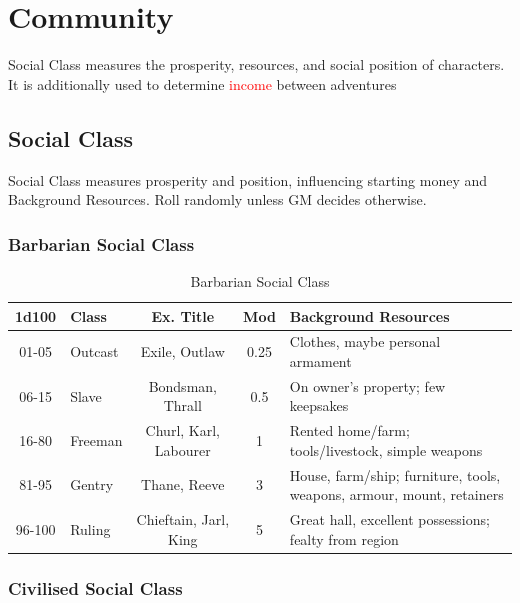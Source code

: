 \documentclass[10pt]{article}
\begin{document}
\section{Community}
\label{sec:community}

Social Class measures the prosperity, resources, and social position of characters. It is additionally used to determine \textcolor{red}{income} between adventures 

\subsection{Social Class}
\label{sec:social-class}

Social Class measures prosperity and position, influencing starting money and Background Resources. Roll randomly unless GM decides otherwise.

\subsubsection{Barbarian Social Class}

\begin{longtable}{|c|l|c|c|p{7cm}|}
\caption{Barbarian Social Class}
\label{tab:barbarian-social-class}\\
\hline
\textbf{1d100} & \textbf{Class} & \textbf{Ex. Title} & \textbf{Mod} & \textbf{Background Resources} \\
\hline
01-05 & Outcast & Exile, Outlaw & 0.25 & Clothes, maybe personal armament \\
\hline
06-15 & Slave & Bondsman, Thrall & 0.5 & On owner's property; few keepsakes \\
\hline
16-80 & Freeman & Churl, Karl, Labourer & 1 & Rented home/farm; tools/livestock, simple weapons \\
\hline
81-95 & Gentry & Thane, Reeve & 3 & House, farm/ship; furniture, tools, weapons, armour, mount, retainers \\
\hline
96-100 & Ruling & Chieftain, Jarl, King & 5 & Great hall, excellent possessions; fealty from region \\
\hline
\end{longtable}

\subsubsection{Civilised Social Class}
\end{document}
